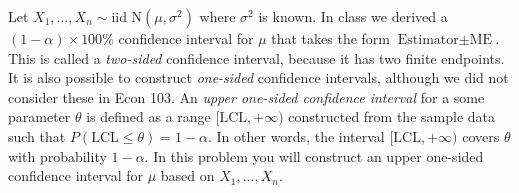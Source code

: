 \documentclass[addpoints,12pt]{exam}
\begin{document}
\begin{questions}





  \question Let $X_1, \dots, X_n \sim \mbox{iid N}(\mu, \sigma^2)$ where $\sigma^2$ is known.
  In class we derived a $(1- \alpha)\times 100\%$ confidence interval for $\mu$ that takes the form $\mbox{Estimator} \pm \mbox{ME}$.
  This is called a \emph{two-sided} confidence interval, because it has two finite endpoints.
  It is also possible to construct \emph{one-sided} confidence intervals, although we did not consider these in Econ 103.
  An \emph{upper one-sided confidence interval} for a some parameter $\theta$ is defined as a range $[\mbox{LCL}, +\infty)$ constructed from the sample data such that $P(\mbox{LCL} \leq \theta) = 1 - \alpha$.
    In other words, the interval $[\mbox{LCL}, +\infty)$ covers $\theta$ with probability $1 - \alpha$.
      In this problem you will construct an upper one-sided confidence interval for $\mu$ based on $X_1, \dots, X_n$.
\end{questions}
\end{document}
